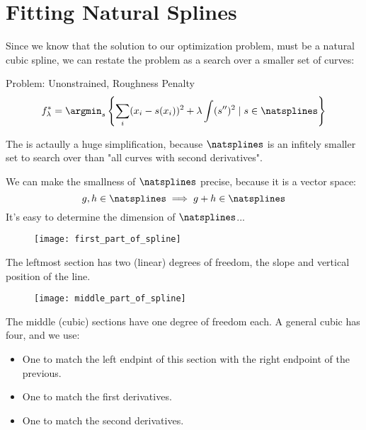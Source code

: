 \section{Fitting Natural Splines}
%
%
\begin{frame}
  Since we know that the solution to our optimization problem, must be a natural cubic spline, we can restate the problem as a search over a smaller set of curves:
  \begin{block}{Problem: Unonstrained, Roughness Penalty}
    $$ f_{\lambda}^* = \argmin_{s} \left\{ \sum_i (x_i - s(x_i))^2 + \lambda \int (s'')^2 \mid s \in \natsplines \right\} $$
  \end{block}
\end{frame}
%
%
\begin{frame}
  The is actaully a huge simplification, because $\natsplines$ is an infitely smaller set to search over than "all curves with second derivatives".
\end{frame}
%
%
\begin{frame}
  We can make the smallness of $\natsplines$ precise, because it is a vector space:
  $$ g, h \in \natsplines \implies g + h \in \natsplines $$
  It's easy to determine the dimension of $\natsplines$... 
\end{frame}
%
%
\begin{frame}
	\begin{figure}
    \texttt{[image: first\_part\_of\_spline]}
	\end{figure}
  The leftmost section has two (linear) degrees of freedom, the slope and vertical position of the line.
\end{frame}
%
%
\begin{frame}
	\begin{figure}
    \texttt{[image: middle\_part\_of\_spline]}
	\end{figure}
  The middle (cubic) sections have one degree of freedom each.  A general cubic has four, and we use:
  \begin{itemize}
    \item One to match the left endpint of this section with the right endpoint of the previous.
    \item One to match the first derivatives.
    \item One to match the second derivatives.
  \end{itemize}
\end{frame}
%
%
